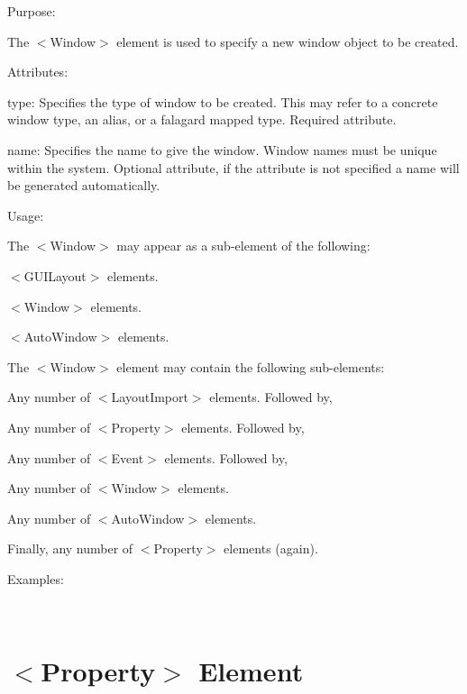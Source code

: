 \begin{DoxyItemize}
\item Purpose\+:
\begin{DoxyItemize}
\item The $<$Window$>$ element is used to specify a new window object to be created.
\end{DoxyItemize}
\item Attributes\+:
\begin{DoxyItemize}
\item {\ttfamily type\+:} Specifies the type of window to be created. This may refer to a concrete window type, an alias, or a falagard mapped type. Required attribute.
\item {\ttfamily name\+:} Specifies the name to give the window. Window names must be unique within the system. Optional attribute, if the attribute is not specified a name will be generated automatically.
\end{DoxyItemize}
\item Usage\+:
\begin{DoxyItemize}
\item The $<$Window$>$ may appear as a sub-\/element of the following\+:
\begin{DoxyItemize}
\item $<$G\+U\+I\+Layout$>$ elements.
\item $<$Window$>$ elements.
\item $<$Auto\+Window$>$ elements.
\end{DoxyItemize}
\item The $<$Window$>$ element may contain the following sub-\/elements\+:
\begin{DoxyItemize}
\item Any number of $<$Layout\+Import$>$ elements. Followed by,
\item Any number of $<$Property$>$ elements. Followed by,
\item Any number of $<$Event$>$ elements. Followed by,
\item Any number of $<$Window$>$ elements.
\item Any number of $<$Auto\+Window$>$ elements.
\item Finally, any number of $<$Property$>$ elements (again).
\end{DoxyItemize}
\end{DoxyItemize}
\item Examples\+:
\end{DoxyItemize}

~\newline
 \hypertarget{xml_layout_xml_layout_property}{}\section{$<$\+Property$>$ Element}\label{xml_layout_xml_layout_property}

